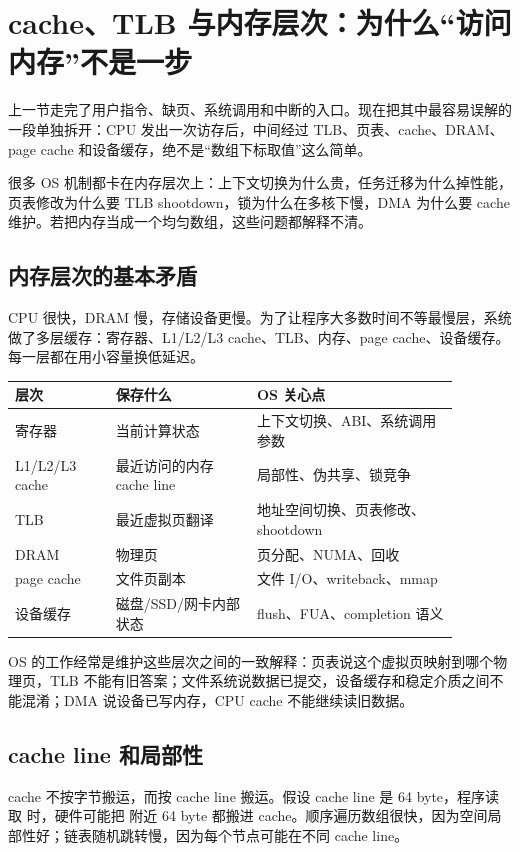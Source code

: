 \section{cache、TLB 与内存层次：为什么“访问内存”不是一步}

上一节走完了用户指令、缺页、系统调用和中断的入口。现在把其中最容易误解的一段单独拆开：CPU 发出一次访存后，中间经过 TLB、页表、cache、DRAM、page cache 和设备缓存，绝不是“数组下标取值”这么简单。

很多 OS 机制都卡在内存层次上：上下文切换为什么贵，任务迁移为什么掉性能，页表修改为什么要 TLB shootdown，锁为什么在多核下慢，DMA 为什么要 cache 维护。若把内存当成一个均匀数组，这些问题都解释不清。

\subsection{内存层次的基本矛盾}

CPU 很快，DRAM 慢，存储设备更慢。为了让程序大多数时间不等最慢层，系统做了多层缓存：寄存器、L1/L2/L3 cache、TLB、内存、page cache、设备缓存。每一层都在用小容量换低延迟。

\begin{longtable}{p{0.2\linewidth}p{0.28\linewidth}p{0.4\linewidth}}
\toprule
层次 & 保存什么 & OS 关心点 \\
\midrule
寄存器 & 当前计算状态 & 上下文切换、ABI、系统调用参数 \\
L1/L2/L3 cache & 最近访问的内存 cache line & 局部性、伪共享、锁竞争 \\
TLB & 最近虚拟页翻译 & 地址空间切换、页表修改、shootdown \\
DRAM & 物理页 & 页分配、NUMA、回收 \\
page cache & 文件页副本 & 文件 I/O、writeback、mmap \\
设备缓存 & 磁盘/SSD/网卡内部状态 & flush、FUA、completion 语义 \\
\bottomrule
\end{longtable}

OS 的工作经常是维护这些层次之间的一致解释：页表说这个虚拟页映射到哪个物理页，TLB 不能有旧答案；文件系统说数据已提交，设备缓存和稳定介质之间不能混淆；DMA 说设备已写内存，CPU cache 不能继续读旧数据。

\subsection{cache line 和局部性}

cache 不按字节搬运，而按 cache line 搬运。假设 cache line 是 64 byte，程序读取  时，硬件可能把  附近 64 byte 都搬进 cache。顺序遍历数组很快，因为空间局部性好；链表随机跳转慢，因为每个节点可能在不同 cache line。

